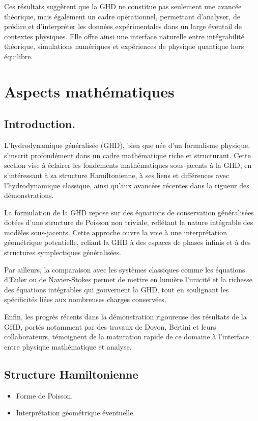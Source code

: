Ces résultats suggèrent que la GHD ne constitue pas seulement une avancée théorique, mais également un cadre opérationnel, permettant d’analyser, de prédire et d’interpréter les données expérimentales dans un large éventail de contextes physiques. Elle offre ainsi une interface naturelle entre intégrabilité théorique, simulations numériques et expériences de physique quantique hors équilibre.

\section{Aspects mathématiques}

\subsection*{Introduction.}
L’hydrodynamique généralisée (GHD), bien que née d’un formalisme physique, s’inscrit profondément dans un cadre mathématique riche et structurant. Cette section vise à éclairer les fondements mathématiques sous-jacents à la GHD, en s’intéressant à sa structure Hamiltonienne, à ses liens et différences avec l’hydrodynamique classique, ainsi qu’aux avancées récentes dans la rigueur des démonstrations.

La formulation de la GHD repose sur des équations de conservation généralisées dotées d’une structure de Poisson non triviale, reflétant la nature intégrable des modèles sous-jacents. Cette approche ouvre la voie à une interprétation géométrique potentielle, reliant la GHD à des espaces de phases infinis et à des structures symplectiques généralisées.

Par ailleurs, la comparaison avec les systèmes classiques comme les équations d’Euler ou de Navier-Stokes permet de mettre en lumière l’unicité et la richesse des équations intégrables qui gouvernent la GHD, tout en soulignant les spécificités liées aux nombreuses charges conservées.

Enfin, les progrès récents dans la démonstration rigoureuse des résultats de la GHD, portés notamment par des travaux de Doyon, Bertini et leurs collaborateurs, témoignent de la maturation rapide de ce domaine à l’interface entre physique mathématique et analyse.


\subsection{Structure Hamiltonienne}
{\color{blue}
\begin{itemize}
    \item Forme de Poisson.
    \item Interprétation géométrique éventuelle.
\end{itemize}
}


